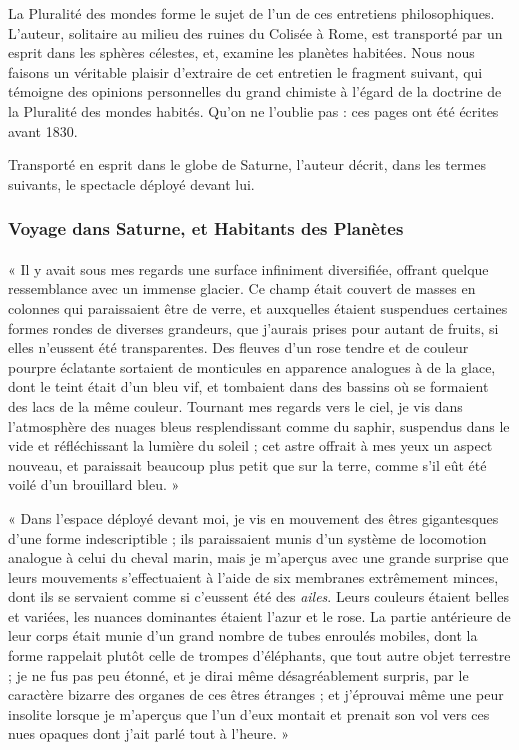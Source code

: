 \documentclass[a4paper, 11pt, oneside]{article}
\begin{document}
La Pluralité des mondes forme le sujet de l'un de ces entretiens philosophiques. L'auteur, solitaire au milieu des ruines du Colisée à Rome, est transporté par un esprit dans les sphères célestes, et, examine les planètes habitées. Nous nous faisons un véritable plaisir d'extraire de cet entretien le fragment suivant, qui témoigne des opinions personnelles du grand chimiste à l'égard de la doctrine de la Pluralité des mondes habités. Qu'on ne l'oublie pas : ces pages ont été écrites avant 1830.

Transporté en esprit dans le globe de Saturne, l'auteur décrit, dans les termes suivants, le spectacle déployé devant lui.

\subsubsection{Voyage dans Saturne, et Habitants des Planètes}
\paragraph{}
« Il y avait sous mes regards une surface infiniment diversifiée, offrant quelque ressemblance avec un immense glacier. Ce champ était couvert de masses en colonnes qui paraissaient être de verre, et auxquelles étaient suspendues certaines formes rondes de diverses grandeurs, que j'aurais prises pour autant de fruits, si elles n'eussent été transparentes. Des fleuves d'un rose tendre et de couleur pourpre éclatante sortaient de monticules en apparence analogues à de la glace, dont le teint était d'un bleu vif, et tombaient dans des bassins où se formaient des lacs de la même couleur. Tournant mes regards vers le ciel, je vis dans l'atmosphère des nuages bleus resplendissant comme du saphir, suspendus dans le vide et réfléchissant la lumière du soleil ; cet astre offrait à mes yeux un aspect nouveau, et paraissait beaucoup plus petit que sur la terre, comme s'il eût été voilé d'un brouillard bleu. »

« Dans l'espace déployé devant moi, je vis en mouvement des êtres gigantesques d'une forme indescriptible ; ils paraissaient munis d'un système de locomotion analogue à celui du cheval marin, mais je m'aperçus avec une grande surprise que leurs mouvements s'effectuaient à l'aide de six membranes extrêmement minces, dont ils se servaient comme si c'eussent été des \emph{ailes}. Leurs couleurs étaient belles et variées, les nuances dominantes étaient l'azur et le rose. La partie antérieure de leur corps était munie d'un grand nombre de tubes enroulés mobiles, dont la forme rappelait plutôt celle de trompes d'éléphants, que tout autre objet terrestre ; je ne fus pas peu étonné, et je dirai même désagréablement surpris, par le caractère bizarre des organes de ces êtres étranges ; et j'éprouvai même une peur insolite lorsque je m'aperçus que l'un d'eux montait et prenait son vol vers ces nues opaques dont j'ait parlé tout à l'heure. »
\end{document}
